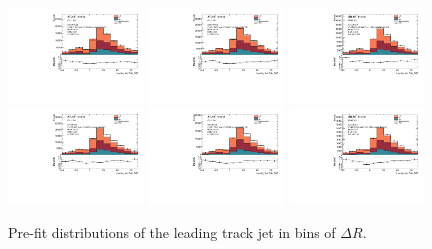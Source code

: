 \begin{figure}[htbp]
  \centering
 \includegraphics[width=0.32\textwidth]{figures/gbb/Sub_Sd0_Fits/Canv_PreFit_02-DeltaR-025_LpT_INF_SpT_INF_coarse_x.pdf}
 \includegraphics[width=0.32\textwidth]{figures/gbb/Sub_Sd0_Fits/Canv_PreFit_025-DeltaR-03_LpT_INF_SpT_INF_coarse_x.pdf}
 \includegraphics[width=0.32\textwidth]{figures/gbb/Sub_Sd0_Fits/Canv_PreFit_03-DeltaR-04_LpT_INF_SpT_INF_coarse_x.pdf}\\
 \includegraphics[width=0.32\textwidth]{figures/gbb/Sub_Sd0_Fits/Canv_PreFit_04-DeltaR-05_LpT_INF_SpT_INF_coarse_x.pdf}
 \includegraphics[width=0.32\textwidth]{figures/gbb/Sub_Sd0_Fits/Canv_PreFit_05-DeltaR-06_LpT_INF_SpT_INF_coarse_x.pdf}
 \includegraphics[width=0.32\textwidth]{figures/gbb/Sub_Sd0_Fits/Canv_PreFit_06-DeltaR-07_LpT_INF_SpT_INF_coarse_x.pdf}\\

\caption{Pre-fit \subsdzero distributions of the leading track jet in bins of $\Delta R$. }
  \label{fig:dR-prefits-leading}
\end{figure}


